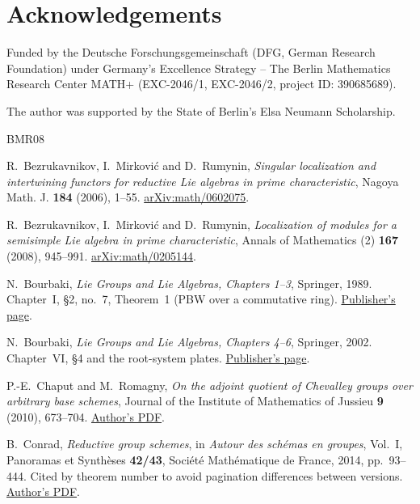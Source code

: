 \documentclass[twoside,a4paper,12pt,reqno]{amsart}
\theoremstyle{remark}
\numberwithin{equation}{section}
\begin{document}
\section*{Acknowledgements}

Funded by the Deutsche Forschungsgemeinschaft (DFG, German Research
Foundation) under Germany's Excellence Strategy -- The Berlin Mathematics
Research Center MATH+ (EXC-2046/1, EXC-2046/2, project ID: 390685689).

The author was supported by the State of Berlin's Elsa Neumann Scholarship.

\begin{thebibliography}{BMR08}

R.~Bezrukavnikov, I.~Mirkovi\'c and D.~Rumynin,
\emph{Singular localization and intertwining functors for reductive Lie algebras in prime characteristic},
Nagoya Math. J. \textbf{184} (2006), 1--55.
\href{https://arxiv.org/abs/math/0602075}{arXiv:math/0602075}.

R.~Bezrukavnikov, I.~Mirkovi\'c and D.~Rumynin,
\emph{Localization of modules for a semisimple Lie algebra in prime characteristic},
Annals of Mathematics (2) \textbf{167} (2008), 945--991.
\href{https://arxiv.org/abs/math/0205144}{arXiv:math/0205144}.

N.~Bourbaki,
\emph{Lie Groups and Lie Algebras, Chapters 1--3},
Springer, 1989.
Chapter~I, \S2, no.~7, Theorem~1 (PBW over a commutative ring).
\href{https://link.springer.com/book/9783540642428}{Publisher's page}.

N.~Bourbaki,
\emph{Lie Groups and Lie Algebras, Chapters 4--6},
Springer, 2002.
Chapter~VI, \S4 and the root-system plates.
\href{https://link.springer.com/book/9783540691716}{Publisher's page}.

P.-E.~Chaput and M.~Romagny,
\emph{On the adjoint quotient of Chevalley groups over arbitrary base schemes},
Journal of the Institute of Mathematics of Jussieu \textbf{9} (2010), 673--704.
\href{https://imag.umontpellier.fr/~romagny/articles/adjoint_quotient.pdf}{Author's PDF}.

B.~Conrad,
\emph{Reductive group schemes},
in \emph{Autour des sch\'emas en groupes}, Vol.~I,
Panoramas et Synth\`eses \textbf{42/43},
Soci\'et\'e Math\'ematique de France, 2014, pp.~93--444.
Cited by theorem number to avoid pagination differences between versions.
\href{https://math.stanford.edu/~conrad/papers/luminysga3smf.pdf}{Author's PDF}.


\end{thebibliography}
\end{document}
